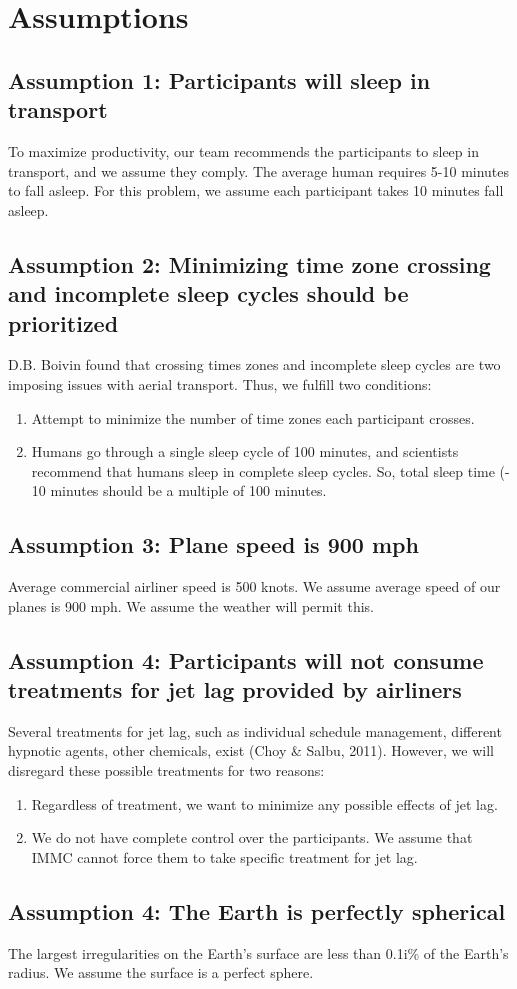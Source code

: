 \section{Assumptions}
\subsection*{Assumption 1: Participants will sleep in transport}
To maximize productivity, our team recommends the participants to sleep in transport, and we assume they comply. The average human requires 5-10 minutes to fall asleep. For this problem, we assume each participant takes 10 minutes fall asleep. 

\subsection*{Assumption 2: Minimizing time zone crossing and incomplete sleep cycles should be prioritized}
D.B. Boivin found that crossing times zones and incomplete sleep cycles are two imposing issues with aerial transport. Thus, we fulfill two conditions:
\begin{enumerate}
	\item Attempt to minimize the number of time zones each participant crosses.
	\item Humans go through a single sleep cycle of 100 minutes, and scientists recommend that humans sleep in complete sleep cycles. So, total sleep time (- 10 minutes  should be a multiple of 100 minutes.
\end{enumerate}

\subsection*{Assumption 3: Plane speed is 900 mph}
Average commercial airliner speed is 500 knots. We assume average speed of our planes is 900 mph. We assume the weather will permit this.

\subsection*{Assumption 4: Participants will not consume treatments for jet lag provided by airliners}
Several treatments for jet lag, such as individual schedule management, different hypnotic agents, other chemicals, exist (Choy \& Salbu, 2011). However, we will disregard these possible treatments for two reasons: 
\begin{enumerate}
	\item Regardless of treatment, we want to minimize any possible effects of jet lag. 
	\item We do not have complete control over the participants. We assume that IMMC cannot force them to take specific treatment for jet lag. 
\end{enumerate}

\subsection*{Assumption 4: The Earth is perfectly spherical}
The largest irregularities on the Earth’s surface are less than 0.1i\% of the Earth’s radius. We assume the surface is a perfect sphere.

